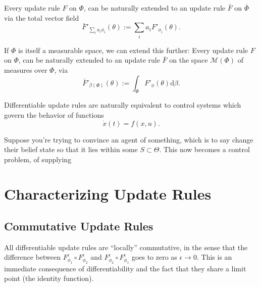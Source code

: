 \documentclass{article}
\newcommand{\ext}[1]{\overline #1} %
\begin{document}
\begin{prop}
    Every  update rule $F$ on $\Phi$, can be naturally extended to an update rule
    $\bar F$ on $\ext\Phi$
    via the total vector field
    \[
        \bar F'_{\textstyle\sum_i a_i \phi_i} ( \theta ) := \sum_{i} a_i F'_{\phi_i}(\theta).
    \]
%
\end{prop}

If $\Phi$ is itself a measurable space, we can extend this further:
Every  update rule $F$ on $\Phi$, can be naturally extended to an update rule $\bar F$ on the space $\mathcal M(\Phi)$ of measures over $\Phi$, via
\[
    \bar F'_{\beta(\Phi)}( \theta ) := \int_{\Phi} F'_\phi(\theta) \mathrm d\beta.
\]




\begin{prop}
    Differentiable update rules are naturally equivalent to control systems
    which govern the behavior of functions
    \[
        \dot x(t) = f(x, u).
    \]
\end{prop}


Suppose you're trying to convince an agent of something, which is to say change their belief state so that it lies within some $S \subset \Theta$.
This now becomes a control problem, of supplying


\section{Characterizing Update Rules}

\subsection{Commutative Update Rules}


All differentiable update rules are ``locally'' commutative, in the sense that the difference between
$F_{\phi_1}^\epsilon \circ F_{\phi_2}^\epsilon$ and
$F_{\phi_2}^\epsilon \circ F_{\phi_1}^\epsilon$ goes to zero as $\epsilon \to 0$.
This is an immediate consequence of differentiability and the fact that they share a limit point (the identity function).
\end{document}
